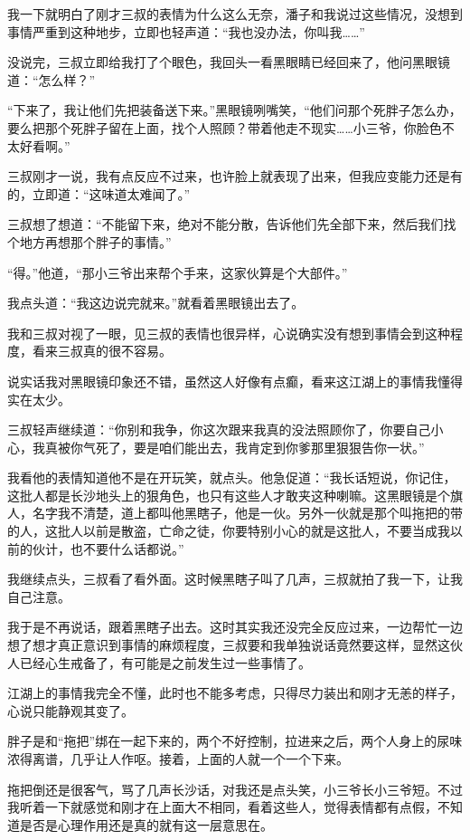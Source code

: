 我一下就明白了刚才三叔的表情为什么这么无奈，潘子和我说过这些情况，没想到事情严重到这种地步，立即也轻声道：“我也没办法，你叫我……”

没说完，三叔立即给我打了个眼色，我回头一看黑眼睛已经回来了，他问黑眼镜道：“怎么样？”

“下来了，我让他们先把装备送下来。”黑眼镜咧嘴笑，“他们问那个死胖子怎么办，要么把那个死胖子留在上面，找个人照顾？带着他走不现实……小三爷，你脸色不太好看啊。”

三叔刚才一说，我有点反应不过来，也许脸上就表现了出来，但我应变能力还是有的，立即道：“这味道太难闻了。”

三叔想了想道：“不能留下来，绝对不能分散，告诉他们先全部下来，然后我们找个地方再想那个胖子的事情。”

“得。”他道，“那小三爷出来帮个手来，这家伙算是个大部件。”

我点头道：“我这边说完就来。”就看着黑眼镜出去了。

我和三叔对视了一眼，见三叔的表情也很异样，心说确实没有想到事情会到这种程度，看来三叔真的很不容易。

说实话我对黑眼镜印象还不错，虽然这人好像有点癫，看来这江湖上的事情我懂得实在太少。

三叔轻声继续道：“你别和我争，你这次跟来我真的没法照顾你了，你要自己小心，我真被你气死了，要是咱们能出去，我肯定到你爹那里狠狠告你一状。”

我看他的表情知道他不是在开玩笑，就点头。他急促道：“我长话短说，你记住，这批人都是长沙地头上的狠角色，也只有这些人才敢夹这种喇嘛。这黑眼镜是个旗人，名字我不清楚，道上都叫他黑瞎子，他是一伙。另外一伙就是那个叫拖把的带的人，这批人以前是散盗，亡命之徒，你要特别小心的就是这批人，不要当成我以前的伙计，也不要什么话都说。”

我继续点头，三叔看了看外面。这时候黑瞎子叫了几声，三叔就拍了我一下，让我自己注意。

我于是不再说话，跟着黑瞎子出去。这时其实我还没完全反应过来，一边帮忙一边想了想才真正意识到事情的麻烦程度，三叔要和我单独说话竟然要这样，显然这伙人已经心生戒备了，有可能是之前发生过一些事情了。

江湖上的事情我完全不懂，此时也不能多考虑，只得尽力装出和刚才无恙的样子，心说只能静观其变了。

胖子是和“拖把”绑在一起下来的，两个不好控制，拉进来之后，两个人身上的尿味浓得离谱，几乎让人作呕。接着，上面的人就一个一个下来。

拖把倒还是很客气，骂了几声长沙话，对我还是点头笑，小三爷长小三爷短。不过我听着一下就感觉和刚才在上面大不相同，看着这些人，觉得表情都有点假，不知道是否是心理作用还是真的就有这一层意思在。

